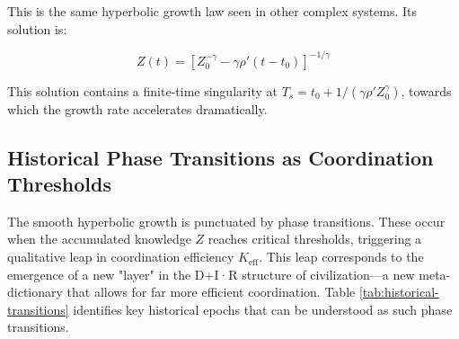 \documentclass[12pt,a4paper]{article}
\theoremstyle{remark}
\begin{document}
	This is the same hyperbolic growth law seen in other complex systems. Its solution is:
	
	\begin{equation}
		Z(t) = \left[ Z_0^{-\gamma} - \gamma \rho' (t - t_0) \right]^{-1/\gamma}
		\label{eq:Z-hyperbolic}
	\end{equation}
	
	This solution contains a finite-time singularity at $T_s = t_0 + 1/(\gamma \rho' Z_0^{\gamma})$, towards which the growth rate accelerates dramatically.
	
	\subsection{Historical Phase Transitions as Coordination Thresholds}
	
	The smooth hyperbolic growth is punctuated by phase transitions. These occur when the accumulated knowledge $Z$ reaches critical thresholds, triggering a qualitative leap in coordination efficiency $K_{\text{eff}}$. This leap corresponds to the emergence of a new "layer" in the D+I·R structure of civilization—a new meta-dictionary that allows for far more efficient coordination. Table \ref{tab:historical-transitions} identifies key historical epochs that can be understood as such phase transitions.
	
\end{document}
